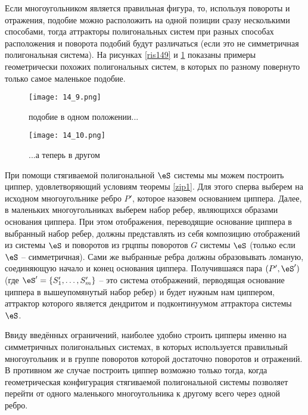 Если многоугольником является правильная фигура, то, используя повороты и отражения, подобие можно расположить на одной позиции сразу несколькими способами, тогда аттракторы полигональных систем при разных способах расположения и поворота подобий будут различаться (если это не симметричная полигональная система). На рисунках \ref{ris149} и \ref{ris1410} показаны примеры геометрически похожих полигональных систем, в которых по разному повернуто только самое маленькое подобие.

\begin{figure}[h!]
\begin{center}
\begin{minipage}[h]{0.48\linewidth}
\texttt{[image: 14\_9.png]}
\caption{подобие в одном положении...} %
\label{ris149} %
\end{minipage}
\hfill
\begin{minipage}[h]{0.48\linewidth}
\texttt{[image: 14\_10.png]}
\caption{...а теперь в другом}%
\label{ris1410}%
\end{minipage}
\end{center}
\end{figure}

При помощи стягиваемой полигональной $\eS$ системы мы можем построить циппер, удовлетворяющий условиям теоремы  \ref{zip1}. Для этого сперва выберем на исходном многоугольнике ребро $P'$, которое назовем основанием циппера. Далее, в маленьких многоугольниках выберем набор ребер, являющихся образами основания циппера. При этом отображения, переводящие основание циппера в выбранный набор ребер, должны представлять из себя композицию отображений из системы $\eS$ и поворотов из грцппы поворотов $G$ системы $\eS$ (только если $\eS$ -- симметричная). Сами же выбранные ребра должны образовывать ломаную, соединяющую начало и конец основания циппера. Получившаяся пара $(P',\eS')$ (где $\eS' = \{S_1',\ldots,S_m'\}$ -- это система отображений, перводящая основание циппера в вышеупомянутый набор ребер) и будет нужным нам циппером, аттрактор которого является дендритом и подконтинуумом аттрактора системы $\eS$. 

Ввиду введённых ограничений, наиболее удобно строить ципперы именно на симметричных полигональных системах, в которых используется правильный многоугольник и в группе поворотов которой достаточно поворотов и отражений. В противном же случае построить циппер возможно только тогда, когда геометрическая конфигурация стягиваемой полигональной системы позволяет перейти от одного маленького многоугольника к другому всего через одной ребро.

